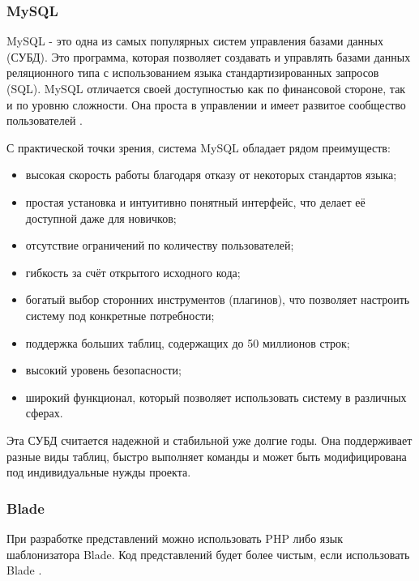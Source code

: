 \subsubsection{MySQL}

MySQL - это одна из самых популярных систем управления базами данных (СУБД). Это программа, которая позволяет создавать и управлять базами данных реляционного типа с использованием языка стандартизированных запросов (SQL). MySQL отличается своей доступностью как по финансовой стороне, так и по уровню сложности. Она проста в управлении и имеет развитое сообщество пользователей \cite{brett}.

С практической точки зрения, система MySQL обладает рядом преимуществ:
\begin{itemize}
	\item высокая скорость работы благодаря отказу от некоторых стандартов языка;
	\item простая установка и интуитивно понятный интерфейс, что делает её доступной даже для новичков;
	\item отсутствие ограничений по количеству пользователей;
	\item гибкость за счёт открытого исходного кода;
	\item богатый выбор сторонних инструментов (плагинов), что позволяет настроить систему под конкретные потребности;
	\item поддержка больших таблиц, содержащих до 50 миллионов строк;
	\item высокий уровень безопасности;
	\item широкий функционал, который позволяет использовать систему в различных сферах.
\end{itemize}

Эта СУБД считается надежной и стабильной уже долгие годы. Она поддерживает разные виды таблиц, быстро выполняет команды и может быть модифицирована под индивидуальные нужды проекта.


\subsubsection{Blade}

При разработке представлений можно использовать PHP либо язык шаблонизатора Blade. Код представлений будет более чистым, если использовать Blade \cite{kirichenko}.

